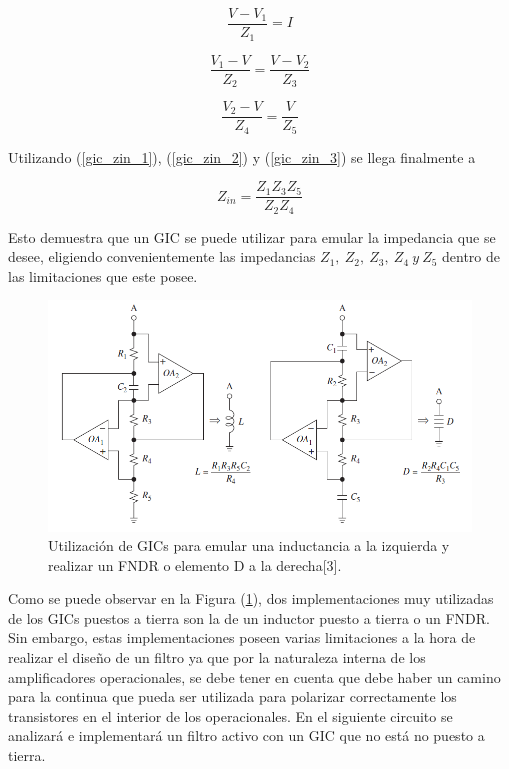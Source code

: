 \documentclass[a4paper]{article}
\begin{document}
\begin{equation}
\frac{V-V_1}{Z_1}=I
\label{gic_zin_1}
\end{equation}

\begin{equation}
\frac{V_1-V}{Z_2} = \frac{V-V_2}{Z_3}
\label{gic_zin_2}
\end{equation}

\begin{equation}
\frac{V_2-V}{Z_4} = \frac{V}{Z_5}
\label{gic_zin_3}
\end{equation}

Utilizando (\ref{gic_zin_1}), (\ref{gic_zin_2}) y (\ref{gic_zin_3}) se llega finalmente a

\begin{equation}
Z_{in} = \frac{Z_1 Z_3 Z_5}{Z_2 Z_4}
\label{grounded_gic_zin}
\end{equation}

Esto demuestra que un GIC se puede utilizar para emular la impedancia que se desee, eligiendo convenientemente las impedancias $Z_1, \ Z_2, \ Z_3, \ Z_4 \ y \ Z_5$ dentro de las limitaciones que este posee.

\begin{figure}[H]
	\centering
	\includegraphics[width=1\textwidth]{Imagenes/gic_ind_fndr.PNG}
	\caption{Utilización de GICs para emular una inductancia a la izquierda y realizar un FNDR o elemento D a la derecha[3].}
	\label{fig:gic_ind_fndr}
\end{figure}

Como se puede observar en la Figura (\ref{fig:gic_ind_fndr}), dos implementaciones muy utilizadas de los GICs puestos a tierra son la de un inductor puesto a tierra o un FNDR. Sin embargo, estas implementaciones poseen varias limitaciones a la hora de realizar el diseño de un filtro ya que por la naturaleza interna de los amplificadores operacionales, se debe tener en cuenta que debe haber un camino para la continua que pueda ser utilizada para polarizar correctamente los transistores en el interior de los operacionales. En el siguiente circuito se analizará e implementará un filtro activo con un GIC que no está no puesto a tierra.
\end{document}

